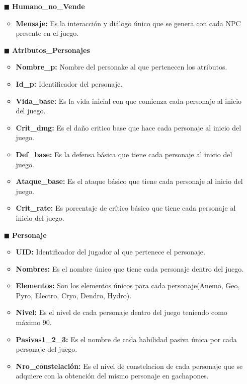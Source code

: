 \documentclass{report}
\begin{document}
\begin{itemize}
    \item[$\blacksquare$]\textbf{Humano\_no\_Vende}
        \begin{itemize}
            \item \textbf{Mensaje:} Es la interacción y diálogo único que se genera con cada NPC presente en el      juego.
        \end{itemize}
    \item[$\blacksquare$]\textbf{Atributos\_Personajes} 
        \begin{itemize}
            \item \textbf{Nombre\_p:} Nombre del personake al que pertenecen los atributos.
            \item \textbf{Id\_p:} Identificador del personaje.
            \item \textbf{Vida\_base:} Es la vida inicial con que comienza cada personaje al inicio del juego.
            \item \textbf{Crit\_dmg:} Es el daño critico base que hace cada personaje al inicio del juego.
            \item \textbf{Def\_base:} Es la defensa básica que tiene cada personaje al inicio del juego.
            \item \textbf{Ataque\_base:} Es el ataque básico que tiene cada personaje al inicio del juego.
            \item \textbf{Crit\_rate:} Es porcentaje de crítico básico que tiene cada personaje al inicio del juego.
        \end{itemize}
    \item[$\blacksquare$]\textbf{Personaje} 
        \begin{itemize}
            \item \textbf{UID:} Identificador del jugador al que pertenece el personaje.
            \item \textbf{Nombres:} Es el nombre único que tiene cada personaje dentro del juego.
            \item \textbf{Elementos:} Son los elementos únicos para cada personaje(Anemo, Geo, Pyro, Electro, Cryo, Dendro, Hydro).
            \item \textbf{Nivel:} Es el nivel de cada personaje dentro del juego teniendo como máximo 90.
            \item \textbf{Pasivas1\_2\_3:} Es el nombre de cada habilidad pasiva única por cada personaje del juego.
            \item \textbf{Nro\_constelación:} Es el nivel de constelacion de cada personaje que se adquiere con la obtención del mismo personaje en gachapones.

\end{itemize}
\end{itemize}
\end{document}
